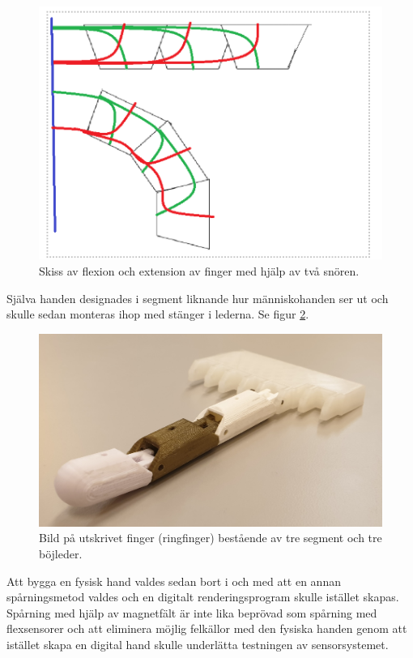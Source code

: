 \documentclass[a4paper]{article}
\begin{document}
\begin{sloppypar}
    \begin{figure}[H]
        \centering
        \includegraphics[width=.9\textwidth]{Skiss-flexion-och-extension.png}
        \caption{Skiss av flexion och extension av finger med hjälp av två snören.}
        \label{fig:flexion-extension}
    \end{figure}
    \noindent
    Själva handen designades i segment liknande hur människohanden ser ut och skulle sedan monteras ihop med stänger i lederna. Se figur \ref{fig:Ringfinger}.

    \begin{figure}[H]
        \centering
        \includegraphics[width=.9\textwidth]{finger-printad.jpg}
        \caption{Bild på utskrivet finger (ringfinger) bestående av tre segment och tre böjleder.}
        \label{fig:Ringfinger}
    \end{figure}
    \noindent
    Att bygga en fysisk hand valdes sedan bort i och med att en annan spårningsmetod valdes och en digitalt renderingsprogram skulle istället skapas.
    Spårning med hjälp av magnetfält är inte lika beprövad som spårning med flexsensorer
    och att eliminera möjlig felkällor med den fysiska handen genom att istället skapa en digital hand skulle underlätta testningen av sensorsystemet.



\end{sloppypar}
\end{document}

